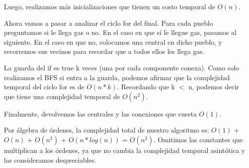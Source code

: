 Luego, realizamos más inicializaciones que tienen un costo temporal de $O(n)$.

Ahora vamos a pasar a analizar el ciclo for del final. Para cada pueblo preguntamos si le llega gas o no. En el caso en que sí le llegue gas, pasamos al siguiente. En el caso en que no, colocamos una central en dicho pueblo, y recorremos sus vecinos para recordar que a todos ellos les llega gas.

La guarda del if es true k veces (una por cada componente conexa). Como solo realizamos el BFS si entra a la guarda, podemos afirmar que la complejidad temporal del ciclo for es de $O(n*k)$. Recordando que k $<$ n, podemos decir que tiene una complejidad temporal de $O(n^2)$.

Finalmente, devolvemos las centrales y las conexiones que cuesta $O(1)$.

Por álgebra de órdenes, la complejidad total de nuestro algoritmo es: $O(1)$ + $O(n)$ + $O(n^2)$ + $O(n*log(n))$ = $O(n^2)$. Omitimos las constantes que multiplican a los órdenes, ya que no cambia la complejidad temporal asintótica y las consideramos despreciables.